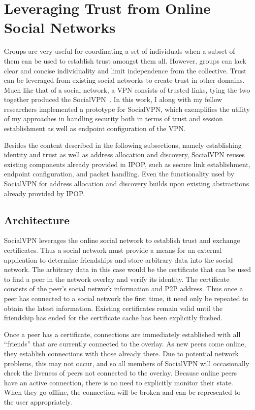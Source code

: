 \section{Leveraging Trust from Online Social Networks}

Groups are very useful for coordinating a set of individuals when a subset of
them can be used to establish trust amongst them all.  However, groups can lack
clear and concise individuality and limit independence from the collective.
Trust can be leveraged from existing social networks to create trust in other
domains.  Much like that of a social network, a VPN consists of trusted links,
tying the two together produced the SocialVPN~\cite{socialvpn}.  In this work,
I along with my fellow researchers implemented a prototype for SocialVPN, which
exemplifies the utility of my approaches in handling security both in terms of
trust and session establishment as well as endpoint configuration of the VPN.

Besides the content described in the following subsections, namely establishing
identity and trust as well as address allocation and discovery, SocialVPN
reuses existing components already provided in IPOP, such as secure link
establishment, endpoint configuration, and packet handling.  Even the
functionality used by SocialVPN for address allocation and discovery builds
upon existing abstractions already provided by IPOP.

\subsection{Architecture}

SocialVPN leverages the online social network to establish trust and exchange
certificates.  Thus a social network must provide a means for an external
application to determine friendships and store arbitrary data into the social
network.  The arbitrary data in this case would be the certificate that can be
used to find a peer in the network overlay and verify its identity.  The
certificate consists of the peer's social network information and P2P address.
Thus once a peer has connected to a social network the first time, it need only
be repeated to obtain the latest information.  Existing certificates remain
valid until the friendship has ended for the certificate cache has been
explicitly flushed.

Once a peer has a certificate, connections are immediately established with all
``friends'' that are currently connected to the overlay.  As new peers come
online, they establish connections with those already there.  Due to potential
network problems, this may not occur, and so all members of SocialVPN will
occasionally check the liveness of peers not connected to the overlay.  Because
online peers have an active connection, there is no need to explicitly monitor
their state.  When they go offline, the connection will be broken and can be
represented to the user appropriately.


